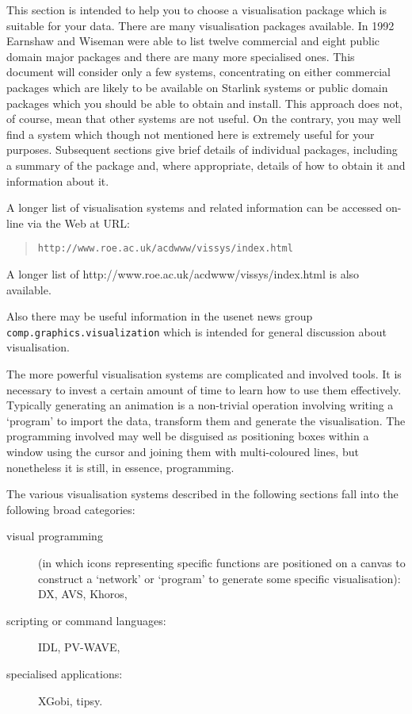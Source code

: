This section is intended to help you to choose a visualisation package
which is suitable for your data. There are many visualisation packages
available. In 1992 Earnshaw and Wiseman\cite{EARNSHAW} were able to
list twelve commercial and eight public domain major packages and there
are many more specialised ones. This document will consider only a few
systems, concentrating on either commercial packages which are likely to
be available on Starlink systems or public domain packages which you
should be able to obtain and install. This approach does not, of course,
mean that other systems are not useful. On the contrary, you may well
find a system which though not mentioned here is extremely useful for
your purposes. Subsequent sections give brief details of individual
packages, including a summary of the package and, where appropriate,
details of how to obtain it and information about it.
\begin{latexonly}
A longer list of visualisation systems and related information can
be accessed on-line via the Web at URL:
\begin{quote}
{\tt http://www.roe.ac.uk/acdwww/vissys/index.html}
\end{quote}
\end{latexonly}
\begin{htmlonly}
A longer list of 
{http://www.roe.ac.uk/acdwww/vissys/index.html} is also available.
\end{htmlonly}
Also there may be useful information in the usenet news group {\tt
comp.graphics.visualization} which is intended for general discussion
about visualisation.

The more powerful visualisation systems are complicated and involved
tools. It is necessary to invest a certain amount of time to learn how
to use them effectively. Typically generating an animation is a
non-trivial operation involving writing a `program' to import the data,
transform them and generate the visualisation. The programming involved
may well be disguised as positioning boxes within a window using the
cursor and joining them with multi-coloured lines, but nonetheless it is
still, in essence, programming.

The various visualisation systems described in the following sections 
fall into the following broad categories:

\begin{description}

  \item[visual programming] (in which icons representing specific
   functions are positioned on a canvas to construct a `network' or
   `program' to generate some specific visualisation): DX, AVS,
   Khoros,

  \item[scripting or command languages:] IDL, PV-WAVE,

  \item[specialised applications:] XGobi, tipsy.

\end{description}

